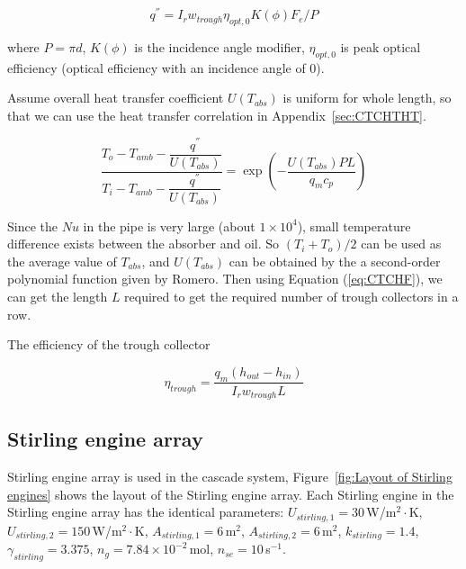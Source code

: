 \documentclass{article}
\begin{document}
\begin{equation*}
	q^{''}=I_rw_{trough}\eta_{opt,0}K(\phi)F_{e}/P
\end{equation*}

where $P=\pi{}d$, $K(\phi)$ is the incidence angle modifier, $\eta_{opt,0}$
is peak optical efficiency (optical efficiency with an incidence angle of 0).

Assume overall heat transfer coefficient $U(T_{abs})$ is uniform for whole length, so that we can use the heat transfer correlation in Appendix~\ref{sec:CTCHTHT}.

\begin{equation}
	\frac{T_{o}-T_{amb}-\dfrac{q^{''}}{U(T_{abs})}}{T_{i}-T_{amb}-\dfrac{q^{''}}{U(T_{abs})}}=\exp(-\frac{U(T_{abs})PL}{q_{m}c_{p}})\label{eq:CTCHF}
\end{equation}

Since the $Nu$ in the pipe is very large (about $1\times10^4$), small temperature difference exists between the absorber and oil. So $(T_{i}+T_{o})/2$ can be used as the average value of $T_{abs}$, and $U(T_{abs})$ can be obtained by the a second-order polynomial function given by Romero\cite{Romero2007}. Then using Equation (\ref{eq:CTCHF}), we can get the length $L$ required to get the required number of trough collectors in a row.

The efficiency of the trough collector

\begin{equation*}
	\eta_{trough}=\frac{q_m(h_{out}-h_{in})}{I_rw_{trough}L}
\end{equation*}

\subsection{Stirling engine array}

Stirling engine array is used in the cascade system, Figure~\ref{fig:Layout of Stirling engines} shows the layout of the Stirling engine array. Each Stirling engine in the Stirling engine array has the identical parameters: $U_{stirling,1}=30\,$W/m$^2\cdot$K, $U_{stirling,2}=150\,$W/m$^2\cdot$K, $A_{stirling,1}=6\,$m$^2$, $A_{stirling,2}=6\,$m$^2$, $k_{stirling}=1.4$, $\gamma_{stirling}=3.375$, $n_g=7.84\times{}10^{-2}\,$mol, $n_{se}=10\,$s$^{-1}$.
\end{document}

